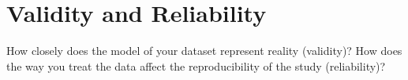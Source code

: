 \section{Validity and Reliability}
\label{validity-and-reliability-not-needed-for-the-project-proposal}

How closely does the model of your dataset represent reality (validity)?
How does the way you treat the data affect the reproducibility of the study (reliability)?

